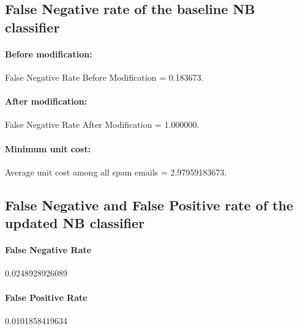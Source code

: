 \documentclass{article}
\begin{document}
\subsection{ False Negative rate of the baseline NB classifier} 
\paragraph{Before modification:}\mbox{}
False Negative Rate Before Modification = 0.183673.
\paragraph{After modification:}\mbox{}
False Negative Rate After Modification = 1.000000.
\paragraph{Minimum unit cost:}\mbox{}
Average unit cost among all spam emails = 2.97959183673.

\subsection{False Negative and False Positive rate of the updated NB classifier}
\paragraph{False Negative Rate}\mbox{}0.0248928926089
\paragraph{False Positive Rate}\mbox{}0.0101858419634
\end{document}
